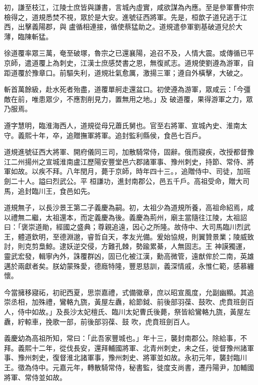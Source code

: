 \begin{pinyinscope}
 初，謙至枝江，江陵士庶皆與謙書，言城內虛實，咸欲謀為內應。至是參軍曹仲宗檢得之，道規悉焚不視，眾於是大安。進號征西將軍。先是，桓歆子道兒逃于江西，出擊義陽郡，與
 盧循相連接，循使蔡猛助之。道規遣參軍劉基破道兒於大薄，臨陳斬猛。



 徐道覆率眾三萬，奄至破塚，魯宗之已還襄陽，追召不及，人情大震。或傳循已平京師，遣道覆上為刺史，江漢士庶感焚書之恩，無復貳志。道規使劉遵為游軍，自距道覆於豫章口。前驅失利，道規壯氣愈厲，激揚三軍；遵自外橫擊，大破之。



 斬首萬餘級，赴水死者殆盡，道覆單舸走還盆口。初使遵為游軍，眾咸云：「今彊敵在前，唯患眾少，不應割削見力，置無用之地。」及
 破道覆，果得游軍之力，眾乃服焉。



 遵字慧明，臨淮海西人，道規從母兄蕭氏舅也。官至右將軍、宣城內史、淮南太守。義熙十年，卒，追贈撫軍將軍。追封監利縣侯，食邑七百戶。



 道規進號征西大將軍、開府儀同三司，加散騎常侍，固辭。俄而寢疾，改授都督豫江二州揚州之宣城淮南盧江歷陽安豐堂邑六郡諸軍事、豫州刺史，持節、常侍、將軍如故。以疾不拜。八年閏月，薨于京師，時年四十三。，追贈侍中、司徒，加班劍二十人。謚曰烈武公。平
 桓謙功，進封南郡公，邑五千戶。高祖受命，贈大司馬，追封臨川王，食邑如先。



 道規無子，以長沙景王第二子義慶為嗣。初，太祖少為道規所養，高祖命紹焉，咸以禮無二繼，太祖還本，而定義慶為後。義慶為荊州，廟主當隨往江陵，太祖詔曰：「褒崇道勛，經國之盛典；尊親追遠，因心之所隆。故侍中、大司馬臨川烈武王，體道欽明，至德淵邈，睿哲自天，孝友光備。爰始協規，則翼贊景業；陵威致討，則克剪梟鯨。逮妖逆交侵，方難孔棘，勢踰累綦，人無固志。王
 神謨獨運，靈武宏發，輯寧內外，誅覆群凶，固已化被江漢，勳高微管，遠猷侔於二南，英雄邁於兩獻者矣。朕幼蒙殊愛，德廕特隆，豐恩慈訓，義深情戚，永惟仁範，感慕纏懷。



 今當擁移寢祏，初祀西夏，思崇嘉禮，式備徽章，庶以昭宣風度，允副幽顯。其追崇丞相，加殊禮，鸞輅九旒，黃屋左纛，給節鉞、前後部羽葆、鼓吹、虎賁班劍百人，侍中如故。」及長沙太妃檀氏、臨川太妃曹氏後薨，祭皆給鸞輅九旒，黃屋左纛，紵輬車，挽歌一部，前後部羽葆、鼓
 吹，虎賁班劍百人。



 義慶幼為高祖所知，常曰：「此吾家豐城也。」年十三，襲封南郡公。除給事，不拜。義熙十二年，從伐長安，還拜輔國將軍、北青州刺史，未之任，徙督豫州諸軍事、豫州刺史，復督淮北諸軍事，豫州刺史、將軍並如故。永初元年，襲封臨川王。徵為侍中。元嘉元年，轉散騎常侍，秘書監，徙度支尚書，遷丹陽尹，加輔國將軍、常侍並如故。




\end{pinyinscope}
